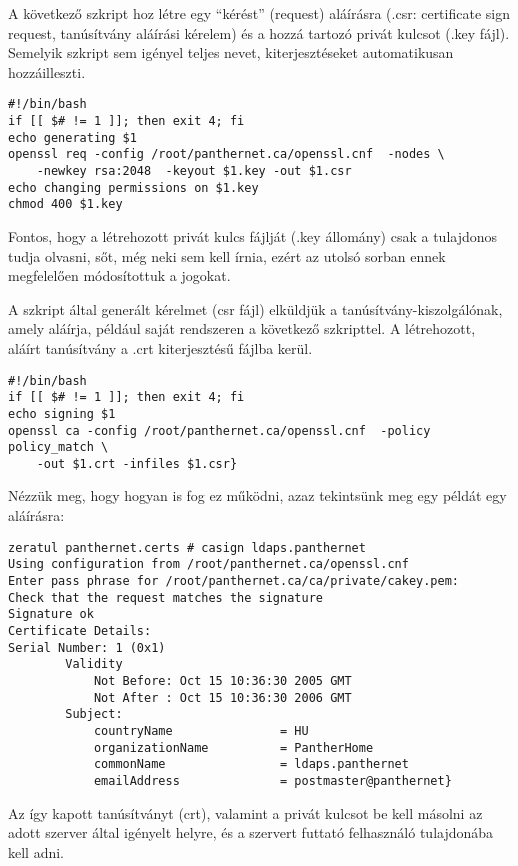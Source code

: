 \noindent A következő szkript hoz létre egy ``kérést'' (request) aláírásra (.csr: certificate
sign request, tanúsítvány aláírási kérelem) és a hozzá tartozó  privát kulcsot (.key fájl). Semelyik szkript sem igényel
teljes nevet, kiterjesztéseket automatikusan hozzáilleszti.

\begin{Verbatim}[frame=single,label=careq]
#!/bin/bash
if [[ $# != 1 ]]; then exit 4; fi
echo generating $1
openssl req -config /root/panthernet.ca/openssl.cnf  -nodes \
    -newkey rsa:2048  -keyout $1.key -out $1.csr
echo changing permissions on $1.key
chmod 400 $1.key
\end{Verbatim}

\noindent Fontos, hogy a létrehozott privát kulcs fájlját (.key állomány) csak a tulajdonos tudja olvasni, sőt, még neki
sem kell írnia, ezért az utolsó sorban ennek megfelelően módosítottuk a jogokat.

A szkript által generált kérelmet (csr fájl) elküldjük a tanúsítvány-kiszolgálónak, amely aláírja, például saját
rendszeren a következő szkripttel. A létrehozott, aláírt tanúsítvány a .crt kiterjesztésű
fájlba kerül.

\begin{Verbatim}[frame=single,label=casign]
#!/bin/bash
if [[ $# != 1 ]]; then exit 4; fi
echo signing $1
openssl ca -config /root/panthernet.ca/openssl.cnf  -policy policy_match \
    -out $1.crt -infiles $1.csr}
\end{Verbatim}

\noindent Nézzük meg, hogy hogyan is fog ez működni, azaz tekintsünk meg egy példát egy aláírásra:

\begin{Verbatim}[frame=single]
zeratul panthernet.certs # casign ldaps.panthernet
Using configuration from /root/panthernet.ca/openssl.cnf
Enter pass phrase for /root/panthernet.ca/ca/private/cakey.pem:
Check that the request matches the signature
Signature ok
Certificate Details:
Serial Number: 1 (0x1)
        Validity
            Not Before: Oct 15 10:36:30 2005 GMT
            Not After : Oct 15 10:36:30 2006 GMT
        Subject:
            countryName               = HU
            organizationName          = PantherHome
            commonName                = ldaps.panthernet
            emailAddress              = postmaster@panthernet}

\end{Verbatim}

\noindent Az így kapott tanúsítványt (crt), valamint a privát kulcsot be kell másolni az adott szerver által igényelt
helyre, és a szervert futtató felhasználó tulajdonába kell adni.




